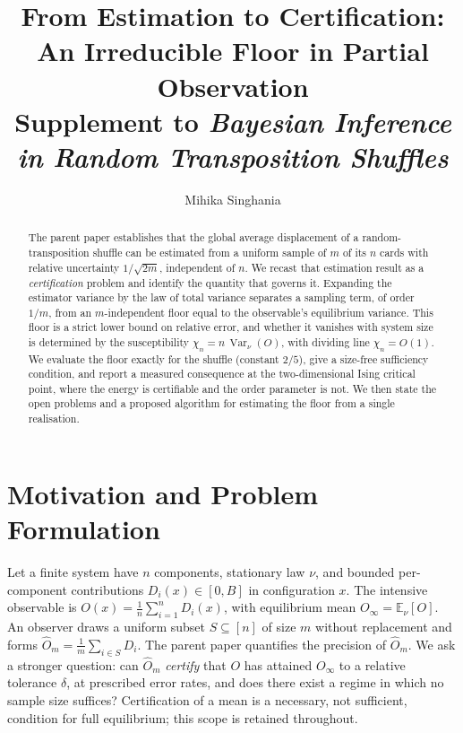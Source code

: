 \documentclass[11pt]{article}
\title{\vspace{-1.4em}\textbf{From Estimation to Certification:\\ An Irreducible Floor in Partial Observation}\\[0.35em]
\normalsize Supplement to \emph{Bayesian Inference in Random Transposition Shuffles}}
\author{Mihika Singhania}
\date{}
\theoremstyle{definition}
\newcommand{\Var}{\operatorname{Var}}
\newcommand{\E}{\mathbb{E}}
\newcommand{\Om}{\widehat{O}_m}
\begin{document}
\maketitle
\vspace{-2em}

\begin{abstract}\noindent\small
The parent paper establishes that the global average displacement of a random-transposition shuffle can be estimated from a uniform sample of $m$ of its $n$ cards with relative uncertainty $1/\sqrt{2m}$, independent of $n$. We recast that estimation result as a \emph{certification} problem and identify the quantity that governs it. Expanding the estimator variance by the law of total variance separates a sampling term, of order $1/m$, from an $m$-independent floor equal to the observable's equilibrium variance. This floor is a strict lower bound on relative error, and whether it vanishes with system size is determined by the susceptibility $\chi_n=n\,\Var_\nu(O)$, with dividing line $\chi_n=O(1)$. We evaluate the floor exactly for the shuffle (constant $2/5$), give a size-free sufficiency condition, and report a measured consequence at the two-dimensional Ising critical point, where the energy is certifiable and the order parameter is not. We then state the open problems and a proposed algorithm for estimating the floor from a single realisation.
\end{abstract}

\section{Motivation and Problem Formulation}
Let a finite system have $n$ components, stationary law $\nu$, and bounded per-component contributions $D_i(x)\in[0,B]$ in configuration $x$. The intensive observable is $O(x)=\tfrac1n\sum_{i=1}^n D_i(x)$, with equilibrium mean $O_\infty=\E_\nu[O]$. An observer draws a uniform subset $S\subseteq[n]$ of size $m$ without replacement and forms $\Om=\tfrac1m\sum_{i\in S}D_i$. The parent paper \citep{rsi} quantifies the precision of $\Om$. We ask a stronger question: can $\Om$ \emph{certify} that $O$ has attained $O_\infty$ to a relative tolerance $\delta$, at prescribed error rates, and does there exist a regime in which no sample size suffices? Certification of a mean is a necessary, not sufficient, condition for full equilibrium; this scope is retained throughout.
\end{document}
